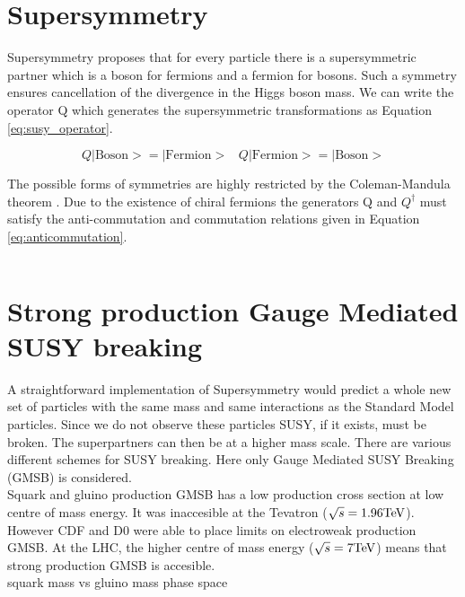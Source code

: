 \section{Supersymmetry}

Supersymmetry proposes that for every particle there is a supersymmetric partner
which is a boson for fermions and a fermion for bosons. Such a symmetry ensures
cancellation of the divergence in the Higgs boson mass. We can write the
operator Q which generates the supersymmetric transformations as Equation
\ref{eq:susy_operator}.

\begin{equation}
Q|\mbox{Boson}> = |\mbox{Fermion}> \hspace{10pt} Q|\mbox{Fermion}> = |\mbox{Boson}>
\label{eq:susy_operator}
\end{equation}

The possible forms of symmetries are highly restricted by the Coleman-Mandula 
theorem \cite{coleman}. Due to the existence of chiral fermions the generators Q
and $Q^{\dagger}$ must satisfy the anti-commutation and commutation relations 
given in Equation \ref{eq:anticommutation}.

\begin{equation}
\label{eq:anticommutation}
\end{equation}

\section{Strong production Gauge Mediated SUSY breaking}

A straightforward implementation of Supersymmetry would predict a whole new set
of particles with the same mass and same interactions as the Standard Model
particles. Since we do not observe these particles SUSY, if it exists, must be 
broken. The superpartners can then be at a higher mass scale. There are various
different schemes for SUSY breaking. Here only Gauge Mediated SUSY Breaking
(GMSB) is considered. \\

Squark and gluino production GMSB has a low production cross section at low
centre of mass energy. It was inaccesible at the Tevatron ($\sqrt{s} = 
1.96\mbox{TeV}$). However CDF and D0 were able to place limits on electroweak 
production GMSB. At the LHC, the higher centre of mass energy ($\sqrt{s} = 
7\mbox{TeV}$) means that strong production GMSB is accesible. \\

squark mass vs gluino mass phase space \\ 

